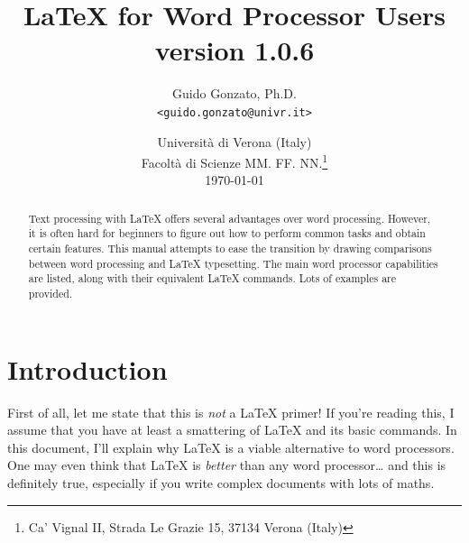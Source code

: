 \documentclass[11pt]{article}
\newcounter{fnsym}
\begin{document}
\setlength{\parindent}{0pt}
\setlength{\parskip}{3pt}

\title{\LaTeX{} for Word Processor Users\\version 1.0.6}

\author{Guido Gonzato, Ph.D.\\
\texttt{<guido.gonzato@univr.it>}}

\renewcommand{\thefootnote}{\fnsymbol{footnote}}
\setcounter{footnote}{2}

\date{Universit\`a di Verona (Italy)\\
Facolt\`a di Scienze MM. FF. NN.\footnote{Ca' Vignal II, Strada 
Le Grazie 15, 37134 Verona (Italy)}\\
\today}

\renewcommand{\thefootnote}{\arabic{footnote}}
\setcounter{footnote}{1}

\maketitle

\begin{abstract}
  Text processing with \LaTeX{} offers several advantages over word
  processing. However, it is often hard for beginners to figure out how to
  perform common tasks and obtain certain features. This manual attempts to
  ease the transition by drawing comparisons between word processing and
  \LaTeX{} typesetting. The main word processor capabilities are listed,
  along with their equivalent \LaTeX{} commands. Lots of examples are
  provided.
\end{abstract}

\begin{footnotesize}
  \tableofcontents
  \listoftables
  \listoffigures
\end{footnotesize}


\pagestyle{fancy}

\section{Introduction}

First of all, let me state that this is \emph{not} a \LaTeX{} primer! If
you're reading this, I assume that you have at least a smattering of
\LaTeX{} and its basic commands. In this document, I'll explain why
\LaTeX{} is a viable alternative to word processors. One may even think
that \LaTeX{} is \emph{better} than any word processor{\ldots} and this is
definitely true, especially if you write complex documents with lots of
maths.
\end{document}
